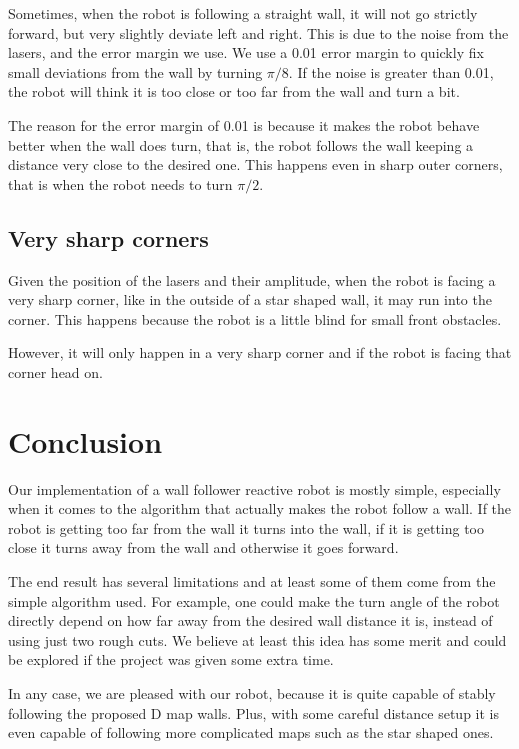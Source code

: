 \documentclass[10pt,journal,compsoc]{IEEEtran}
\begin{document}
Sometimes, when the robot is following a straight wall, it will not go strictly forward, but very slightly deviate left and right. This is due to the noise from the lasers, and the error margin we use. We use a 0.01 error margin to quickly fix small deviations from the wall by turning $\pi/8$. If the noise is greater than 0.01, the robot will think it is too close or too far from the wall and turn a bit.

The reason for the error margin of 0.01 is because it makes the robot behave better when the wall does turn, that is, the robot follows the wall keeping a distance very close to the desired one. This happens even in sharp outer corners, that is when the robot needs to turn $\pi/2$.

\subsection{Very sharp corners}

Given the position of the lasers and their amplitude, when the robot is facing a very sharp corner, like in the outside of a star shaped wall, it may run into the corner. This happens because the robot is a little blind for small front obstacles.

However, it will only happen in a very sharp corner and if the robot is facing that corner head on.


\section{Conclusion}

Our implementation of a wall follower reactive robot is mostly simple, especially when it comes to the algorithm that actually makes the robot follow a wall. If the robot is getting too far from the wall it turns into the wall, if it is getting too close it turns away from the wall and otherwise it goes forward.

The end result has several limitations and at least some of them come from the simple algorithm used. For example, one could make the turn angle of the robot directly depend on how far away from the desired wall distance it is, instead of using just two rough cuts. We believe at least this idea has some merit and could be explored if the project was given some extra time.

In any case, we are pleased with our robot, because it is quite capable of stably following the proposed D map walls. Plus, with some careful distance setup it is even capable of following more complicated maps such as the star shaped ones.

\ifCLASSOPTIONcaptionsoff
\newpage
\fi



\end{document}
